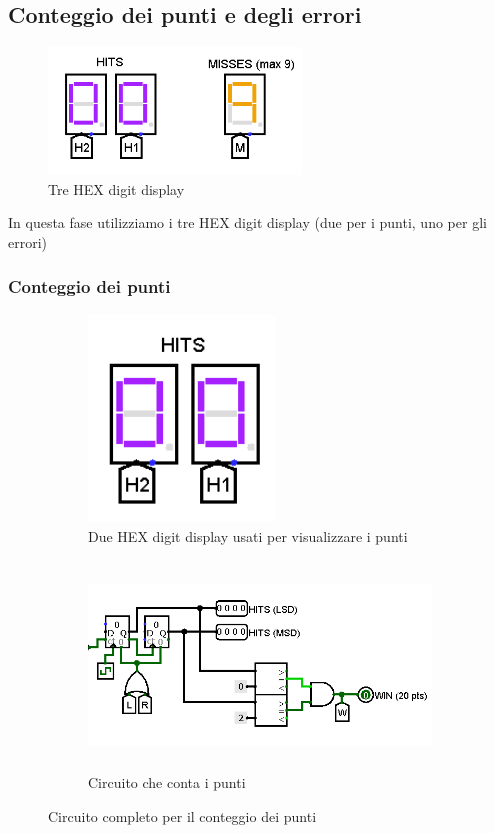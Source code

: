 \documentclass[11pt]{article}
\begin{document}
\pagebreak
\subsection{Conteggio dei punti e degli errori}

\begin{figure}[!htpb]
\centering
\includegraphics[width=0.6\textwidth, center]{immagini/hex_digit_display}
\caption{Tre HEX digit display}
\label{fig:fig8}
\end{figure}

In questa fase utilizziamo i tre HEX digit display (due per i punti, uno per gli errori)
\subsubsection{Conteggio dei punti}

\begin{figure}[h]
\begin{subfigure}{0.3\textwidth}
\includegraphics[width=1\linewidth, height=5.5cm]{immagini/hex_digit_display_hit} 
\caption{Due HEX digit display usati per visualizzare i punti}
\label{fig:subfig1}
\end{subfigure}
\begin{subfigure}{0.8\textwidth}
\includegraphics[width=1.05\linewidth, height=5.5cm]{immagini/circuito_hit}
\caption{Circuito che conta i punti}
\label{fig:subfig2}
\end{subfigure}
\caption{Circuito completo per il conteggio dei punti}
\label{fig:fig9}
\end{figure}
\end{document}
